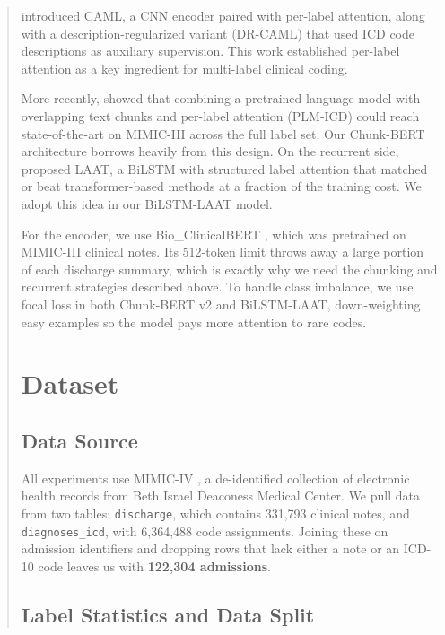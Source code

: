 \documentclass[11pt,a4paper]{article}
\begin{document}
\begin{abstract}
\citet{mullenbach2018explainable} introduced CAML, a CNN encoder paired with per-label attention, along with a description-regularized variant (DR-CAML) that used ICD code descriptions as auxiliary supervision. This work established per-label attention as a key ingredient for multi-label clinical coding.

More recently, \citet{huang2022plmicd} showed that combining a pretrained language model with overlapping text chunks and per-label attention (PLM-ICD) could reach state-of-the-art on MIMIC-III across the full label set. Our Chunk-BERT architecture borrows heavily from this design. On the recurrent side, \citet{vu2020label} proposed LAAT, a BiLSTM with structured label attention that matched or beat transformer-based methods at a fraction of the training cost. We adopt this idea in our BiLSTM-LAAT model.

For the encoder, we use Bio\_ClinicalBERT \cite{alsentzer2019publicly}, which was pretrained on MIMIC-III clinical notes. Its 512-token limit throws away a large portion of each discharge summary, which is exactly why we need the chunking and recurrent strategies described above. To handle class imbalance, we use focal loss \cite{lin2017focal} in both Chunk-BERT v2 and BiLSTM-LAAT, down-weighting easy examples so the model pays more attention to rare codes.

\section{Dataset}

\subsection{Data Source}
All experiments use MIMIC-IV \cite{johnson2023mimiciv}, a de-identified collection of electronic health records from Beth Israel Deaconess Medical Center. We pull data from two tables: \texttt{discharge}, which contains 331,793 clinical notes, and \texttt{diagnoses\_icd}, with 6,364,488 code assignments. Joining these on admission identifiers and dropping rows that lack either a note or an ICD-10 code leaves us with \textbf{122,304 admissions}.

\subsection{Label Statistics and Data Split}


\end{abstract}
\end{document}
